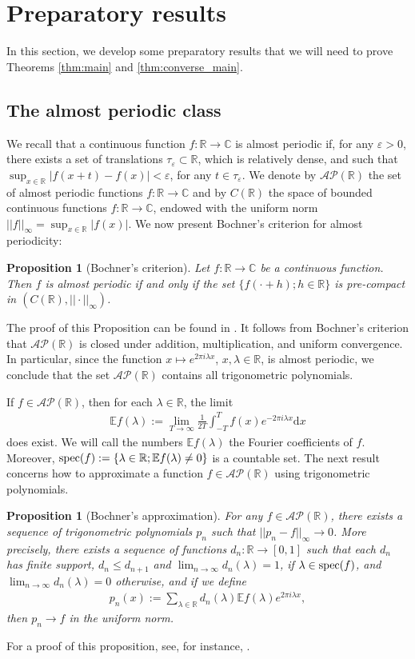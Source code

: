 \documentclass[a4paper,reqno,12pt]{amsart}
\newtheorem{proposition}[theorem]{Proposition}
\newcommand{\A}{\mathcal{A}}
\renewcommand{\P}{\mathcal{P}}
\renewcommand{\r}{\mathbb{R}}
\newcommand{\cp}{\mathbb{C}} %
\newcommand{\la}{\lambda}
\newcommand{\ep}{\varepsilon}
\renewcommand{\d}{\mathrm{d}}
\newcommand{\cd}{\cdot}
\newcommand{\1}{{\bf 1}}
\newcommand{\ra}{\rightarrow}
\newcommand{\e}{\mathbb{E}}
\newcommand{\mt}{\mapsto}
\newcommand{\spec}{{\rm spec}}
\begin{document}
\section{Preparatory results}
\label{sec:aux_results}
In this section, we develop some preparatory results that we will need to prove Theorems \ref{thm:main} and \ref{thm:converse_main}.
\subsection{The almost periodic class}
\label{section:almost_periodic_class}
We recall that a continuous function $f:\r\ra\cp$ is almost periodic if, for any $\ep>0$, there exists a set of translations $\tau_\ep\subset\r$, which is relatively dense, and such that $\sup_{x\in\r} |f(x+t)-f(x)|<\ep$, for any $t\in\tau_\ep$. We denote by $\A\P(\r)$ the set of almost periodic functions $f:\r\ra\cp$ and by $C(\r)$ the space of bounded continuous functions $f:\r\ra\cp$, endowed with the uniform norm $||f||_{\infty}=\sup_{x\in\r} |f(x)|$. We now present Bochner's criterion for almost periodicity:
\begin{proposition}[Bochner's criterion]
    Let $f:\r\ra\cp$ be a continuous function. Then $f$ is almost periodic if and only if the set $\{f(\cd+h);h\in\r\}$ is pre-compact in $(C(\r),||\cd||_{\infty})$.
\end{proposition}
The proof of this Proposition can be found in \cite[Section 1.2]{AP}. It follows from Bochner's criterion that $\A\P(\r)$ is closed under addition, multiplication, and uniform convergence. In particular, since the function $x\mt e^{2\pi i\la x}$, $x,\la\in\r$, is almost periodic, we conclude that the set $\A\P(\r)$ contains all trigonometric polynomials.

If $f\in\A\P(\r)$, then for each $\la\in\r$, the limit
\begin{align*}
    \e f(\la):=\lim_{T\ra\infty} \frac{1}{2T} \int_{-T}^{T} f(x) e^{-2\pi i\la x}\d x
\end{align*}
does exist. We will call the numbers $\e f(\la)$ the Fourier coefficients of $f$. Moreover, $\spec(f):=\{\la\in\r; \e f(\la)\neq0\}$ is a countable set. The next result concerns how to approximate a function $f\in\A\P(\r)$ using trigonometric polynomials.
\begin{proposition}[Bochner's approximation]
\label{prop:Bochner_approximation}
    For any $f\in\A\P(\r)$, there exists a sequence of trigonometric polynomials $p_n$ such that $||p_n-f||_{\infty}\ra0$. More precisely, there exists a sequence of functions $d_n:\r\ra[0,1]$ such that each $d_n$ has finite support, $d_n\leq d_{n+1}$ and $\lim_{n\ra\infty} d_n(\la)=1$, if $\la\in\spec(f)$, and $\lim_{n\ra\infty} d_n(\la)=0$ otherwise, and if we define 
    \begin{align*}
        p_n(x):=\sum_{\la\in\r} d_n(\la)\e f(\la) e^{2\pi i\la x},
    \end{align*}
    then $p_n\ra f$ in the uniform norm.
\end{proposition} 
For a proof of this proposition, see, for instance, \cite[Section 1.9]{Be}.
\end{document}
